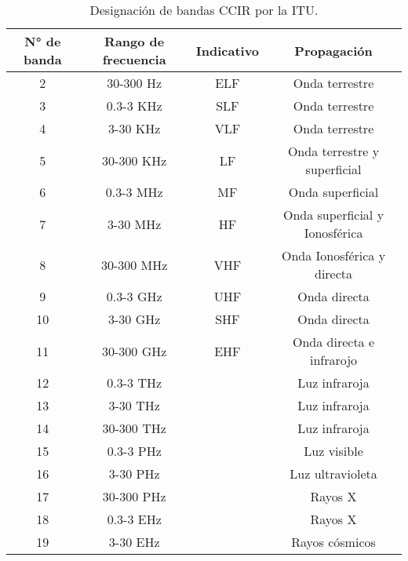 \documentclass[12pt,fleqn,a4paper,oneside]{LegrandOrangeBook}
\begin{document}
\begin{table}[H]
\centering
\begin{tabular}{|c|c|c|c|}
\hline
\rowcolor[HTML]{9698ED} 
N° de banda & Rango de frecuencia & Indicativo & Propagación                    \\ \hline
2           & 30-300 Hz           & ELF        & Onda terrestre                 \\ \hline
3           & 0.3-3 KHz           & SLF        & Onda terrestre                 \\ \hline
4           & 3-30 KHz            & VLF        & Onda terrestre                 \\ \hline
5           & 30-300 KHz          & LF         & Onda terrestre y superficial   \\ \hline
6           & 0.3-3 MHz           & MF         & Onda superficial               \\ \hline
7           & 3-30 MHz            & HF         & Onda superficial y Ionosférica \\ \hline
8           & 30-300 MHz          & VHF        & Onda Ionosférica y directa     \\ \hline
9           & 0.3-3 GHz           & UHF        & Onda directa                   \\ \hline
10          & 3-30 GHz            & SHF        & Onda directa                   \\ \hline
11          & 30-300 GHz          & EHF        & Onda directa e infrarojo       \\ \hline
12          & 0.3-3 THz           &            & Luz infraroja                  \\ \hline
13          & 3-30 THz            &            & Luz infraroja                  \\ \hline
14          & 30-300 THz          &            & Luz infraroja                  \\ \hline
15          & 0.3-3 PHz           &            & Luz visible                    \\ \hline
16          & 3-30 PHz            &            & Luz ultravioleta               \\ \hline
17          & 30-300 PHz          &            & Rayos X                        \\ \hline
18          & 0.3-3 EHz           &            & Rayos X                        \\ \hline
19          & 3-30 EHz            &            & Rayos cósmicos                 \\ \hline
\end{tabular}
\caption{Designación de bandas CCIR por la ITU.}
\end{table}
\end{document}
